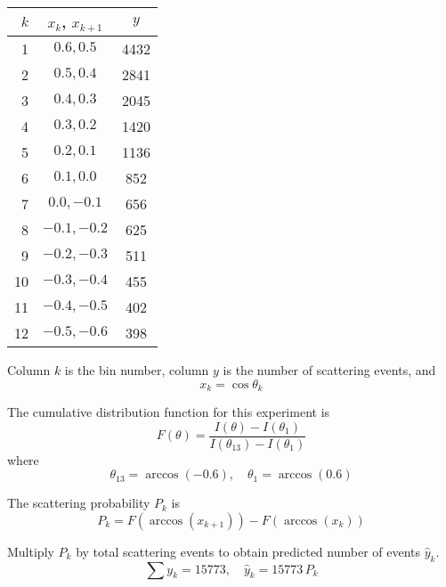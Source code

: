 \documentclass[12pt]{article}
\begin{document}
\begin{center}
\begin{tabular}{|r|c|c|}
\hline
$k$ & $x_k$, $x_{k+1}$ & $y$\\
\hline
1 & $0.6, 0.5$ & 4432\\
2 & $0.5, 0.4$ & 2841\\
3 & $0.4, 0.3$ & 2045\\
4 & $0.3, 0.2$ & 1420\\
5 & $0.2, 0.1$ & 1136\\
6 & $0.1, 0.0$ & 852\\
7 & $0.0, -0.1$ & 656\\
8 & $-0.1, -0.2$ & 625\\
9 & $-0.2, -0.3$ & 511\\
10 & $-0.3, -0.4$ & 455\\
11 & $-0.4, -0.5$ & 402\\
12 & $-0.5, -0.6$ & 398\\
\hline
\end{tabular}
\end{center}

Column $k$ is the bin number, column $y$ is the number of scattering events, and
\begin{equation*}
x_k=\cos\theta_k
\end{equation*}

The cumulative distribution function for this experiment is
\begin{equation*}
F(\theta)=\frac{I(\theta)-I(\theta_1)}
{I(\theta_{13})-I(\theta_1)}
\end{equation*}
where
\begin{equation*}
\theta_{13}=\arccos(-0.6),
\quad
\theta_1=\arccos(0.6)
\end{equation*}

The scattering probability $P_k$ is
\begin{equation*}
P_k=F\left(\arccos(x_{k+1})\right)-F\left(\arccos(x_k)\right)
\end{equation*}

Multiply $P_k$ by total scattering events to obtain predicted number of events $\hat{y}_k$.
\begin{equation*}
\sum y_k=15773,\quad \hat{y}_k=15773\,P_k
\end{equation*}
\end{document}
